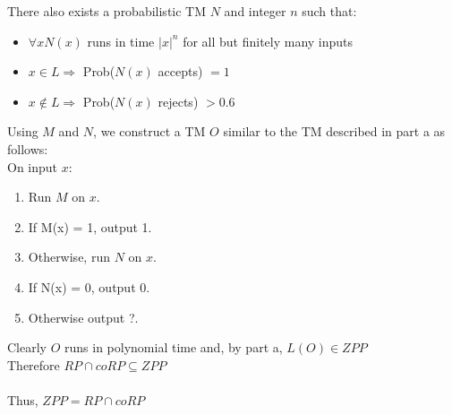 \documentclass[letterpaper,notitlepage,twoside]{article}
\begin{document}
There also exists a probabilistic TM $N$ and integer $n$ such that:
\begin{itemize}
\item $\forall x N(x)$ runs in time $|x|^{n}$ for all but finitely many inputs
\item $x \in L \Rightarrow$ Prob($N(x)$ accepts) $=1$
\item $x \notin L \Rightarrow$ Prob($N(x)$ rejects) $> 0.6$
\end{itemize}
Using $M$ and $N$, we construct a TM $O$ similar to the TM described in part a as follows: \\
On input $x$:
\begin{enumerate}
  \item Run $M$ on $x$.
  \item If M(x) = 1, output 1.
  \item Otherwise, run $N$ on $x$.
  \item If N(x) = 0, output 0.
  \item Otherwise output ?.
\end{enumerate}
Clearly $O$ runs in polynomial time and, by part a, $L(O) \in ZPP$ \\
Therefore $RP \cap coRP \subseteq ZPP$
\\ \\
Thus, $ZPP = RP \cap coRP$
\end{document}

